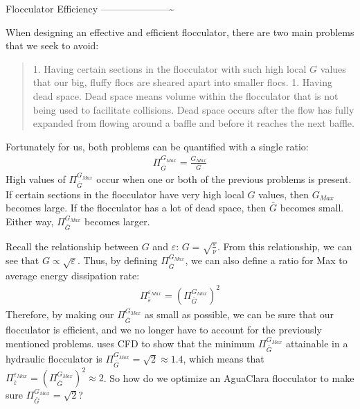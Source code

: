 \documentclass[letterpaper,10pt,english]{sphinxmanual}
\begin{document}
Flocculator Efficiency
———————\textasciitilde{}

When designing an effective and efficient flocculator, there are two main problems that we seek to avoid:
\begin{quote}

1. Having certain sections in the flocculator with such high local \(G\) values that our big, fluffy flocs are sheared apart into smaller flocs.
1. Having dead space. Dead space means volume within the flocculator that is not being used to facilitate collisions. Dead space occurs after the flow has fully expanded from flowing around a baffle and before it reaches the next baffle.
\end{quote}

Fortunately for us, both problems can be quantified with a single ratio:
\begin{equation}\label{equation:Flocculation/Floc_Design:Flocculation/Floc_Design:11}
\begin{split}\Pi_{\bar G}^{G_{Max}} = \frac{G_{Max}}{\bar G}\end{split}
\end{equation}
High values of \(\Pi_{\bar G}^{G_{Max}}\) occur when one or both of the previous problems is present. If certain sections in the flocculator have very high local \(G\) values, then \(G_{Max}\) becomes large. If the flocculator has a lot of dead space, then \(\bar G\) becomes small. Either way, \(\Pi_{\bar G}^{G_{Max}}\) becomes larger.

 Recall the relationship between \(G\) and \(\varepsilon\): \(G = \sqrt{ \frac{\varepsilon}{\nu} }\). From this relationship, we can see that \(G \propto \sqrt{\varepsilon}\). Thus, by defining \(\Pi_{\bar G}^{G_{Max}}\), we can also define a ratio for Max to average energy dissipation rate:
\begin{equation}\label{equation:Flocculation/Floc_Design:Flocculation/Floc_Design:12}
\begin{split}\Pi_{\bar \varepsilon}^{\varepsilon_{Max}} = \left( \Pi_{\bar G}^{G_{Max}} \right)^2\end{split}
\end{equation}
Therefore, by making our \(\Pi_{\bar G}^{G_{Max}}\) as small as possible, we can be sure that our flocculator is efficient, and we no longer have to account for the previously mentioned problems.  uses CFD to show that the minimum \(\Pi_{\bar G}^{G_{Max}}\) attainable in a hydraulic flocculator is \(\Pi_{\bar G}^{G_{Max}} = \sqrt{2} \approx 1.4\), which means that \(\Pi_{\bar \varepsilon}^{\varepsilon_{Max}} = \left( \Pi_{\bar G}^{G_{Max}} \right)^2 \approx 2\). So how do we optimize an AguaClara flocculator to make sure \(\Pi_{\bar G}^{G_{Max}} = \sqrt{2}\)?
\end{document}
